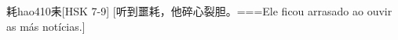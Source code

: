 \begin{EntryWithPhonetic}{耗}{hao4}{10}{⽾}[HSK 7-9]
  [听到噩耗，他碎心裂胆。===Ele ficou arrasado ao ouvir as más notícias.]
\end{EntryWithPhonetic}
